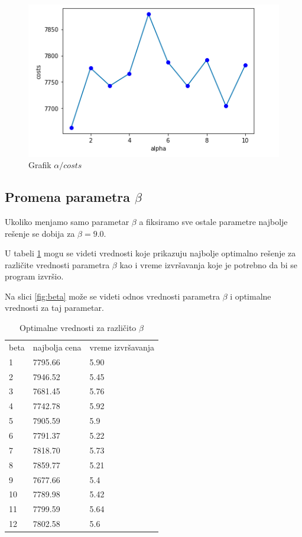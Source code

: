\documentclass[a4paper]{article}
\begin{document}
\begin{figure}[h!]
\begin{center}
\includegraphics[scale=0.7]{alpha.png}
\end{center}
\caption{Grafik $\alpha / costs$}
\label{fig:alpha}
\end{figure}

\subsection{Promena parametra $\beta$}

Ukoliko menjamo samo parametar $\beta$ a fiksiramo sve ostale parametre najbolje rešenje se dobija za $\beta = 9.0$.  

U tabeli \ref{tab:beta} mogu se videti vrednosti koje prikazuju najbolje optimalno rešenje za različite vrednosti parametra $\beta$ kao i vreme izvršavanja koje je potrebno da bi se program izvršio.

Na slici \ref{fig:beta} može se videti odnos vrednosti parametra $\beta$ i optimalne vrednosti za taj parametar.

\begin{table}[h]
\begin{center}
\begin{tabular}{ |p{2cm}|p{2cm}|p{2cm}|  }
\hline
\rowcolor{lightgray} \multicolumn{3}{|c|}{Promena parametra $\beta$} \\
\hline
beta & najbolja cena & vreme izvršavanja \\
\hline
1 & 7795.66 & 5.90 \\
2 & 7946.52 & 5.45 \\
3 & 7681.45 & 5.76  \\
4 & 7742.78 & 5.92 \\
5 & 7905.59 & 5.9 \\
6 & 7791.37 & 5.22 \\
7 & 7818.70 & 5.73 \\
8 & 7859.77 & 5.21 \\
\rowcolor{cyan}
9 & 7677.66 & 5.4 \\
10 & 7789.98 & 5.42 \\
11 & 7799.59 & 5.64 \\
12 & 7802.58 & 5.6 \\
\hline
\end{tabular}
\end{center}
\caption {Optimalne vrednosti za različito $\beta$ \label{tab:beta}}
\end{table}
\end{document}
